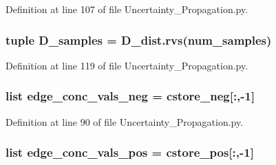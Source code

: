 Definition at line 107 of file Uncertainty\-\_\-\-Propagation.\-py.

\hypertarget{namespace_uncertainty___propagation_a5b16e1d69bbcd5334cdddf537c3171d2}{
\subsubsection[{D\-\_\-samples}]{\setlength{\rightskip}{0pt plus 5cm}tuple D\-\_\-samples = D\-\_\-dist.\-rvs({\bf num\-\_\-samples})}}\label{namespace_uncertainty___propagation_a5b16e1d69bbcd5334cdddf537c3171d2}


Definition at line 119 of file Uncertainty\-\_\-\-Propagation.\-py.

\hypertarget{namespace_uncertainty___propagation_acb92094c722cb9231eae663f2d7563ca}{
\subsubsection[{edge\-\_\-conc\-\_\-vals\-\_\-neg}]{\setlength{\rightskip}{0pt plus 5cm}list edge\-\_\-conc\-\_\-vals\-\_\-neg = cstore\-\_\-neg\mbox{[}\-:,-\/1\mbox{]}}}\label{namespace_uncertainty___propagation_acb92094c722cb9231eae663f2d7563ca}


Definition at line 90 of file Uncertainty\-\_\-\-Propagation.\-py.

\hypertarget{namespace_uncertainty___propagation_a2e425dd5abbd47ca217c22c04bb45c3e}{
\subsubsection[{edge\-\_\-conc\-\_\-vals\-\_\-pos}]{\setlength{\rightskip}{0pt plus 5cm}list edge\-\_\-conc\-\_\-vals\-\_\-pos = cstore\-\_\-pos\mbox{[}\-:,-\/1\mbox{]}}}\label{namespace_uncertainty___propagation_a2e425dd5abbd47ca217c22c04bb45c3e}


